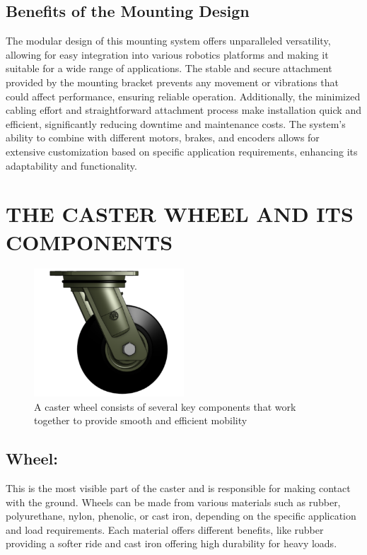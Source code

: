 \documentclass[../../main]{subfiles}
\begin{document}
\subsection{Benefits of the Mounting Design}
The modular design of this mounting system offers unparalleled versatility, allowing for easy integration into various robotics platforms and making it suitable for a wide range of applications. The stable and secure attachment provided by the mounting bracket prevents any movement or vibrations that could affect performance, ensuring reliable operation. Additionally, the minimized cabling effort and straightforward attachment process make installation quick and efficient, significantly reducing downtime and maintenance costs. The system's ability to combine with different motors, brakes, and encoders allows for extensive customization based on specific application requirements, enhancing its adaptability and functionality.

\section{THE CASTER WHEEL AND ITS COMPONENTS}

\begin{figure}[h!]
  \centering
  \includegraphics[width=0.5\textwidth]{img/caster.png}
  \caption[Key Components of a Caster Wheel]{A caster wheel consists of several key components that work together to provide smooth and efficient mobility}

  \end{figure}

\subsection{Wheel:}
This is the most visible part of the caster and is responsible for making contact with the ground. Wheels can be made from various materials such as rubber, polyurethane, nylon, phenolic, or cast iron, depending on the specific application and load requirements. Each material offers different benefits, like rubber providing a softer ride and cast iron offering high durability for heavy loads.
\end{document}
